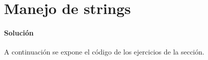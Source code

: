 \section{Manejo de strings}

  \paragraph{Solución}
  A continuación se expone el código de los ejercicios de la sección.
  
  
    
